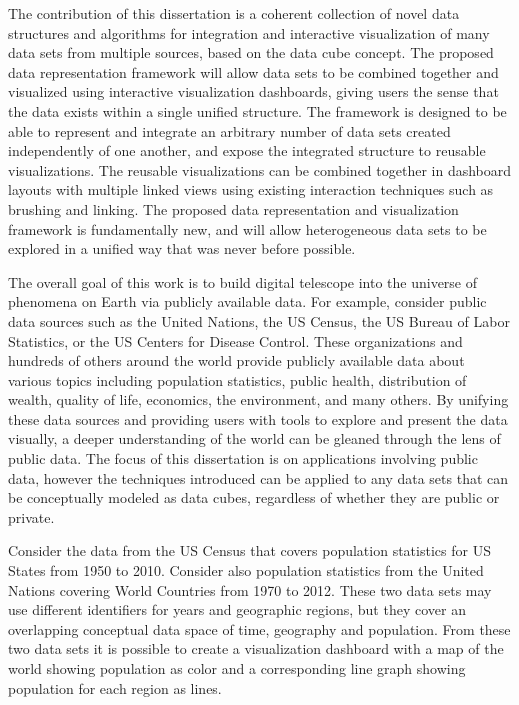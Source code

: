 The contribution of this dissertation is a coherent collection of novel data structures and algorithms for integration and interactive visualization of many data sets from multiple sources, based on the data cube concept. The proposed data representation framework will allow data sets to be combined together and visualized using interactive visualization dashboards, giving users the sense that the data exists within a single unified structure. The framework is designed to be able to represent and integrate an arbitrary number of data sets created independently of one another, and expose the integrated structure to reusable visualizations. The reusable visualizations can be combined together in dashboard layouts with multiple linked views using existing interaction techniques such as brushing and linking. The proposed data representation and visualization framework is fundamentally new, and will allow heterogeneous data sets to be explored in a unified way that was never before possible. 

The overall goal of this work is to build digital telescope into the universe of phenomena on Earth via publicly available data. For example, consider public data sources such as the United Nations, the US Census, the US Bureau of Labor Statistics, or the US Centers for Disease Control. These organizations and hundreds of others around the world provide publicly available data about various topics including population statistics, public health, distribution of wealth, quality of life, economics, the environment, and many others. By unifying these data sources and providing users with tools to explore and present the data visually, a deeper understanding of the world can be gleaned through the lens of public data. The focus of this dissertation is on applications involving public data, however the techniques introduced can be applied to any data sets that can be conceptually modeled as data cubes, regardless of whether they are public or private. 

Consider the data from the US Census that covers population statistics for US States from 1950 to 2010. Consider also population statistics from the United Nations covering World Countries from 1970 to 2012. These two data sets may use different identifiers for years and geographic regions, but they cover an overlapping conceptual data space of time, geography and population. From these two data sets it is possible to create a visualization dashboard with a map of the world showing population as color and a corresponding line graph showing population for each region as lines.

